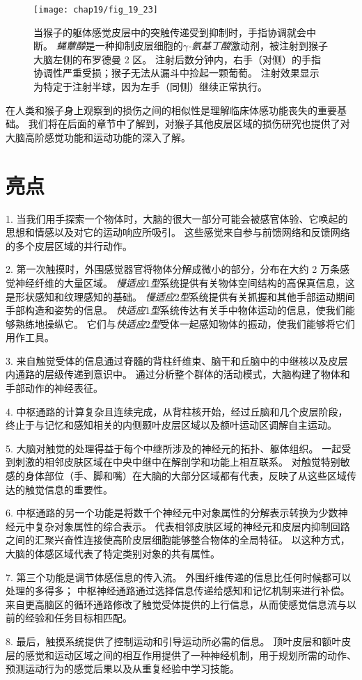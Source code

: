 \begin{figure}[htbp]
	\centering
	\texttt{[image: chap19/fig\_19\_23]}
	\caption{当猴子的躯体感觉皮层中的突触传递受到抑制时，手指协调就会中断。
		\textit{蝇蕈醇}是一种抑制皮层细胞的\textit{$\gamma$-氨基丁酸}激动剂，被注射到猴子大脑左侧的布罗德曼 2 区。
		注射后数分钟内，右手（对侧）的手指协调性严重受损；猴子无法从漏斗中捡起一颗葡萄。
		注射效果显示为特定于注射半球，因为左手（同侧）继续正常执行\cite{hikosaka1985deficits}。}
	\label{fig:19_23}
\end{figure}


在人类和猴子身上观察到的损伤之间的相似性是理解临床体感功能丧失的重要基础。 
我们将在后面的章节中了解到，对猴子其他皮层区域的损伤研究也提供了对大脑高阶感觉功能和运动功能的深入了解。


\section{亮点}

1. 当我们用手探索一个物体时，大脑的很大一部分可能会被感官体验、它唤起的思想和情感以及对它的运动响应所吸引。
这些感觉来自参与前馈网络和反馈网络的多个皮层区域的并行动作。


2. 第一次触摸时，外围感觉器官将物体分解成微小的部分，分布在大约 2 万条感觉神经纤维的大量区域。 
\textit{慢适应}1\textit{型}系统提供有关物体空间结构的高保真信息，这是形状感知和纹理感知的基础。
\textit{慢适应}2\textit{型}系统提供有关抓握和其他手部运动期间手部构造和姿势的信息。
\textit{快适应}1\textit{型}系统传达有关手中物体运动的信息，使我们能够熟练地操纵它。
它们与\textit{快适应}2\textit{型}受体一起感知物体的振动，使我们能够将它们用作工具。 


3. 来自触觉受体的信息通过脊髓的背柱纤维束、脑干和丘脑中的中继核以及皮层内通路的层级传递到意识中。 
通过分析整个群体的活动模式，大脑构建了物体和手部动作的神经表征。


4. 中枢通路的计算复杂且连续完成，从背柱核开始，经过丘脑和几个皮层阶段，终止于与记忆和感知相关的内侧颞叶皮层区域以及额叶运动区调解自主运动。


5. 大脑对触觉的处理得益于每个中继所涉及的神经元的拓扑、躯体组织。
一起受到刺激的相邻皮肤区域在中央中继中在解剖学和功能上相互联系。
对触觉特别敏感的身体部位（手、脚和嘴）在大脑的大部分区域都有代表，反映了从这些区域传达的触觉信息的重要性。


6. 中枢通路的另一个功能是将数千个神经元中对象属性的分解表示转换为少数神经元中复杂对象属性的综合表示。
代表相邻皮肤区域的神经元和皮层内抑制回路之间的汇聚兴奋性连接使高阶皮层细胞能够整合物体的全局特征。
以这种方式，大脑的体感区域代表了特定类别对象的共有属性。


7. 第三个功能是调节体感信息的传入流。
外围纤维传递的信息比任何时候都可以处理的多得多； 中枢神经通路通过选择信息传递给感知和记忆机制来进行补偿。
来自更高脑区的循环通路修改了触觉受体提供的上行信息，从而使感觉信息流与以前的经验和任务目标相匹配。 


8. 最后，触摸系统提供了控制运动和引导运动所必需的信息。
顶叶皮层和额叶皮层的感觉和运动区域之间的相互作用提供了一种神经机制，用于规划所需的动作、预测运动行为的感觉后果以及从重复经验中学习技能。


